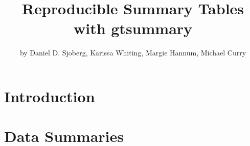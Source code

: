 \title{Reproducible Summary Tables with gtsummary}
\author{by Daniel D. Sjoberg, Karissa Whiting, Margie Hannum, Michael Curry}

\maketitle


\hypertarget{introduction}{%
\section{Introduction}\label{introduction}}

\hypertarget{data-summaries}{%
\section{Data Summaries}\label{data-summaries}}






\address{Author One\\
  Affiliation\\
  Address\\
  Country\\
  (ORCiD if desired)\\
  }

\address{Author Two\\
  Affiliation\\
  Address\\
  Country\\
  (ORCiD if desired)\\
  }

\address{Author Three\\
  Affiliation\\
  Address\\
  Country\\
  (ORCiD if desired)\\
  }
